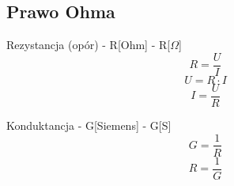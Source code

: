 \subsection{Prawo Ohma}

Rezystancja (opór) - R[Ohm] - R[$\Omega$]
\begin{equation}
R=\frac{U}{I}
\end{equation}
\begin{equation}
U=R \cdot I
\end{equation}
\begin{equation}
I=\frac{U}{R}
\end{equation}

Konduktancja - G[Siemens] - G[S]
\begin{equation}
G=\frac{1}{R}
\end{equation}
\begin{equation}
R=\frac{1}{G}
\end{equation}
















